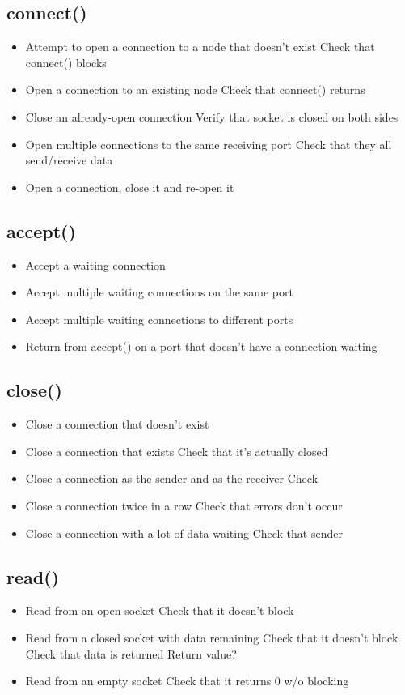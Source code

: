 \documentclass[]{article}
\begin{document}
\subsection{connect()}
\begin{itemize}
	\item Attempt to open a connection to a node that doesn't exist
	\subitem Check that connect() blocks
	\item Open a connection to an existing node
	\subitem Check that connect() returns
	\item Close an already-open connection
	\subitem Verify that socket is closed on both sides
	\item Open multiple connections to the same receiving port
	\subitem Check that they all send/receive data
	\item Open a connection, close it and re-open it
\end{itemize}
\subsection{accept()}
\begin{itemize}
	\item Accept a waiting connection
	\item Accept multiple waiting connections on the same port
	\item Accept multiple waiting connections to different ports
	\item Return from accept() on a port that doesn't have a connection waiting
\end{itemize}
\subsection{close()}
\begin{itemize}
	\item Close a connection that doesn't exist
	\item Close a connection that exists
	\subitem Check that it's actually closed
	\item Close a connection as the sender and as the receiver
	\subitem Check 
	\item Close a connection twice in a row
	\subitem Check that errors don't occur
	\item Close a connection with a lot of data waiting
	\subitem Check that sender 
\end{itemize}
\subsection{read()}
\begin{itemize}
	\item Read from an open socket
	\subitem Check that it doesn't block
	\item Read from a closed socket with data remaining
	\subitem Check that it doesn't block
	\subitem Check that data is returned
	\subitem Return value?
	\item Read from an empty socket
	\subitem Check that it returns 0 w/o blocking
\end{itemize}
\end{document}
